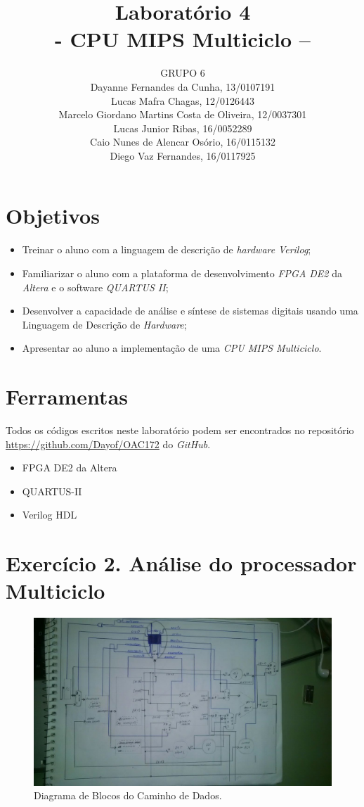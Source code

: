 \documentclass[12pt]{article}
\title{Laboratório 4\\- CPU MIPS Multiciclo –}
\author{GRUPO 6\\
	Dayanne Fernandes da Cunha, 13/0107191\\
	Lucas Mafra Chagas, 12/0126443\\
	Marcelo Giordano Martins Costa de Oliveira, 12/0037301\\
	Lucas Junior Ribas, 16/0052289\\
	Caio Nunes de Alencar Osório, 16/0115132\\
	Diego Vaz Fernandes, 16/0117925}
\begin{document}
\maketitle

\section{Objetivos}
\label{sec:Objetivos}

\begin{itemize}
\item Treinar o aluno com a linguagem de descrição de \textit{hardware} \textit{Verilog};
\item Familiarizar o aluno com a plataforma de desenvolvimento \textit{FPGA DE2} da \textit{Altera} e o software \textit{QUARTUS II};
\item Desenvolver a capacidade de análise e síntese de sistemas digitais usando uma Linguagem de Descrição de \textit{Hardware};
\item Apresentar ao aluno a implementação de uma \textit{CPU MIPS Multiciclo}.
\end{itemize}

\section{Ferramentas}
\label{sec:Materiais}

Todos os códigos escritos neste laboratório podem ser encontrados no repositório \url{https://github.com/Dayof/OAC172} do \textit{GitHub}.

\begin{itemize}
\item FPGA DE2 da Altera 
\item QUARTUS-II
\item Verilog HDL
\end{itemize}

\section{Exercício 2. Análise do processador Multiciclo}
\label{sec:multiciclo}


\begin{figure}[H]
	\flushleft
	\includegraphics[width=1\textwidth]{diagrama_blocos.jpg}
	\caption{Diagrama de Blocos do Caminho de Dados.}
	\label{fig:pfunct}
\end{figure}
\end{document}
